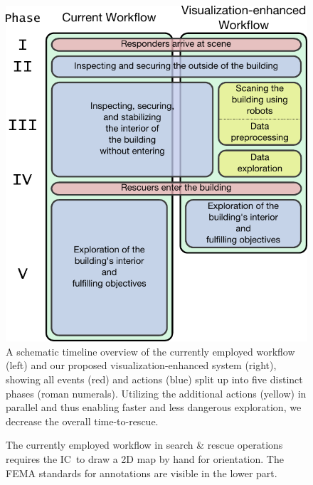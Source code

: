 \documentclass[review,journal]{vgtc}         %
\def\IC{IC}
\begin{document}
\begin{figure}
	\centering
	\includegraphics[width=0.9\columnwidth]{figures/workflow.pdf}
	\caption{A schematic timeline overview of the currently employed workflow (left) and our proposed visualization-enhanced system (right), showing all events (red) and actions (blue) split up into five distinct phases (roman numerals). Utilizing the additional actions (yellow) in parallel and thus enabling faster and less dangerous exploration, we decrease the overall time-to-rescue.}
	\label{fig:workflow:workflow}
\end{figure}

\begin{figure}[b]
    \vspace{-0.2cm}
	\centering
	\caption{The currently employed workflow in search \& rescue operations requires the \IC\ to draw a 2D map by hand for orientation. The FEMA standards for annotations are visible in the lower part.}
	\label{fig:workflow:sota}
\end{figure}
\end{document}
